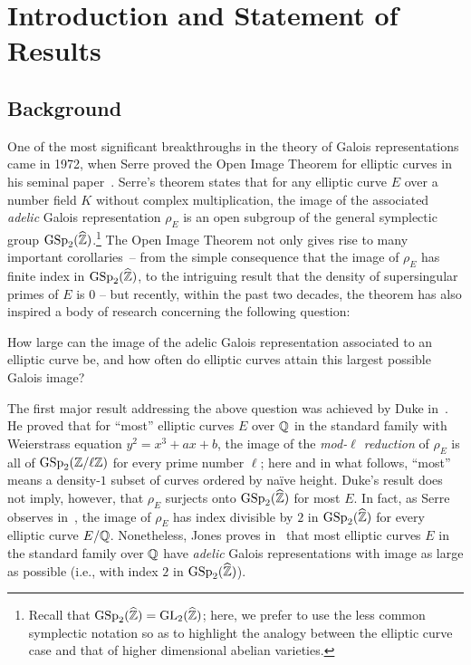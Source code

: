 \section{Introduction and Statement of Results}
\label{section:introduction}

\subsection{Background}
One of the most significant breakthroughs in the theory of Galois representations came in 1972, when Serre proved the Open Image Theorem for elliptic curves in his seminal paper~\cite{causalrelationship}.
Serre's theorem states that for any elliptic curve $E$ over a number field $K$ without complex multiplication, the image of the associated \emph{adelic} Galois representation $\rho_E$ is an open subgroup of the general symplectic group $\operatorname{GSp}_2(\widehat{\mathbb Z})$.\footnote{Recall that $\operatorname{GSp}_2(\widehat{\mathbb Z})= \mathrm{GL}_2(\widehat{\mathbb Z})$; here, we prefer to use the less common symplectic notation so as to highlight the analogy between the elliptic curve case and that of higher dimensional abelian varieties.} The Open Image Theorem not only gives rise to many important \mbox{corollaries --} from the simple consequence that the image of $\rho_E$ has finite index in $\operatorname{GSp}_2(\widehat{\mathbb Z})$, to the intriguing result that the density of supersingular primes of $E$ is $0$ -- but recently, within the past two decades, the theorem has also inspired a body of research concerning the following question:

\begin{question}
How large can the image of the adelic Galois representation associated to an elliptic curve be, and how often do elliptic curves attain this largest possible Galois image?
\end{question}

The first major result addressing the above question was achieved by Duke in~\cite{duke:elliptic-curves-with-no-exceptional-primes}. He proved that for  ``most'' elliptic curves $E$ over $\mathbb Q$ in the standard family with Weierstrass equation $y^2 = x^3 + ax + b$, the image of the \emph{mod-$\ell$ reduction} of $\rho_E$ is all of $\operatorname{GSp}_2(\mathbb Z/\ell \mathbb Z)$ for every prime number $\ell$;
here and in what follows, ``most'' means a density-$1$ subset of curves ordered by na\"{i}ve height.
Duke's result does not imply, however, that $\rho_E$ surjects onto $\operatorname{GSp}_2(\widehat{\mathbb Z})$ for most $E$. In fact, as
Serre observes in~\cite{causalrelationship}, the image of $\rho_E$ has index divisible by $2$ in $\operatorname{GSp}_2(\widehat{\mathbb Z})$ for every elliptic curve $E/\mathbb Q$. Nonetheless, Jones proves in~\cite[Theorem 4]{josofabank} that most elliptic curves $E$ in the standard family over $\mathbb Q$ have \emph{adelic} Galois representations with image as large as possible (i.e., with index $2$ in $\operatorname{GSp}_2(\widehat{\mathbb Z})$).

